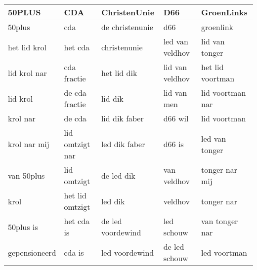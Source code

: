 \begin{tabular}{lllll}
\toprule
        50PLUS &              CDA &       ChristenUnie &              D66 &        GroenLinks \\
\midrule
        50plus &              cda &    de christenunie &              d66 &         groenlink \\
  het lid krol &          het cda &       christenunie &  led van veldhov &    lid van tonger \\
  lid krol nar &      cda fractie &        het lid dik &  lid van veldhov &  het lid voortman \\
      lid krol &   de cda fractie &            lid dik &      lid van men &  lid voortman nar \\
      krol nar &           de cda &      lid dik faber &          d66 wil &      lid voortman \\
  krol nar mij &  lid omtzigt nar &      led dik faber &           d66 is &    led van tonger \\
    van 50plus &      lid omtzigt &         de led dik &      van veldhov &    tonger nar mij \\
          krol &  het lid omtzigt &            led dik &          veldhov &        tonger nar \\
     50plus is &       het cda is &  de led voordewind &       led schouw &    van tonger nar \\
 gepensioneerd &           cda is &     led voordewind &    de led schouw &      led voortman \\
\bottomrule
\end{tabular}
